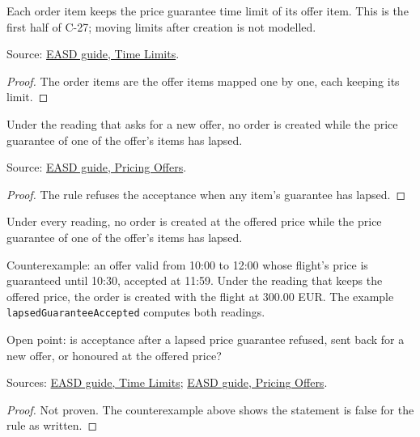 \begin{theorem}
  \label{thm:offers-create-keeps-guarantee}
  Each order item keeps the price guarantee time limit of its offer item.
  This is the first half of C-27; moving limits after creation is not
  modelled.

  Source: \href{https://standards.atlassian.net/wiki/spaces/EASD/pages/574423066/Time+Limits}{EASD guide, Time Limits}.
\end{theorem}
\begin{proof}
  The order items are the offer items mapped one by one, each keeping its
  limit.
\end{proof}

\begin{theorem}
  \label{thm:offers-create-reprice}
  Under the reading that asks for a new offer, no order is created while
  the price guarantee of one of the offer's items has lapsed.

  Source: \href{https://standards.atlassian.net/wiki/spaces/EASD/pages/574423098/Pricing+Offers}{EASD guide, Pricing Offers}.
\end{theorem}
\begin{proof}
  The rule refuses the acceptance when any item's guarantee has lapsed.
\end{proof}

\begin{theorem}
  \label{thm:offers-create-price-guaranteed}
  Under every reading, no order is created at the offered price while the
  price guarantee of one of the offer's items has lapsed.

  Counterexample: an offer valid from 10:00 to 12:00 whose flight's price
  is guaranteed until 10:30, accepted at 11:59. Under the reading that
  keeps the offered price, the order is created with the flight at
  300.00 EUR. The example \texttt{lapsedGuaranteeAccepted} computes both
  readings.

  Open point: is acceptance after a lapsed price guarantee refused, sent
  back for a new offer, or honoured at the offered price?

  Sources: \href{https://standards.atlassian.net/wiki/spaces/EASD/pages/574423066/Time+Limits}{EASD guide, Time Limits};
  \href{https://standards.atlassian.net/wiki/spaces/EASD/pages/574423098/Pricing+Offers}{EASD guide, Pricing Offers}.
\end{theorem}
\begin{proof}
  Not proven. The counterexample above shows the statement is false for the
  rule as written.
\end{proof}

